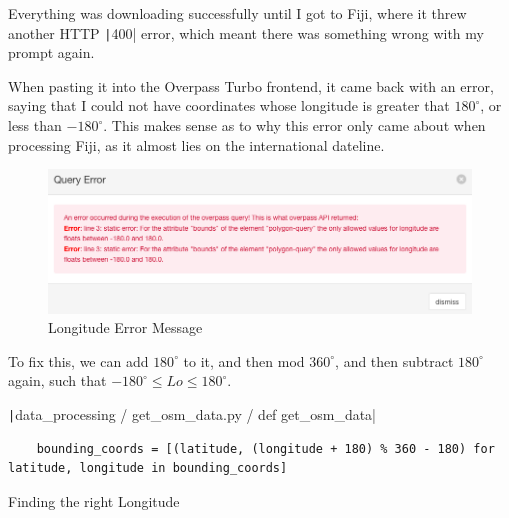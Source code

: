 \documentclass[12pt]{report}
\newcommand{\pil}[1]{\protect\texttt|#1|}
\begin{document}
\begin{center}
\end{center}

Everything was downloading successfully until I got to Fiji, where it threw another HTTP \pil{400} error, which meant there was something wrong with my prompt again.

When pasting it into the Overpass Turbo frontend, it came back with an error, saying that I could not have coordinates whose longitude is greater that $180^{\circ}$, or less than $-180^{\circ}$. This makes sense as to why this error only came about when processing Fiji, as it almost lies on the international dateline.

\begin{figure}[H]
\centering
\includegraphics[width=14cm]{ss5.9.png}
\caption{Longitude Error Message}\label{fig:ss5.9}
\end{figure}

To fix this, we can add $180^{\circ}$ to it, and then mod $360^{\circ}$, and then subtract $180^{\circ}$ again, such that $-180^{\circ}\leq Lo\leq 180^{\circ}$. 

\begin{listing}[H]
\pil{data_processing / get_osm_data.py / def get_osm_data}
\begin{verbatim}
    bounding_coords = [(latitude, (longitude + 180) % 360 - 180) for latitude, longitude in bounding_coords]
\end{verbatim}
\caption{Finding the right Longitude}\label{cs:findRightLongitude}
\end{listing}
\end{document}

